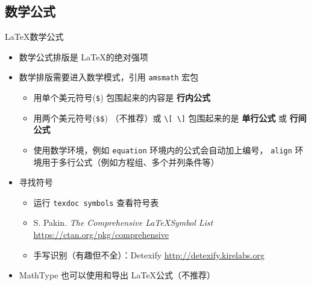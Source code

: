     \subsection{数学公式}
    \begin{frame}[fragile]{\LaTeX 数学公式}
        \begin{itemize}
        \item 数学公式排版是 \LaTeX 的绝对强项
        \item 数学排版需要进入数学模式，引用 \texttt{amsmath} 宏包
            \begin{itemize}
            \item 用单个美元符号(\verb|$|) 包围起来的内容是 {\bf 行内公式}
          \item 用两个美元符号(\verb|$$|) （不推荐）或 \verb|\[ \]| 包围起来的是 {\bf 单行公式} 或 {\bf 行间公式}
            \item 使用数学环境，例如 \texttt{equation} 环境内的公式会自动加上编号，
                \texttt{align} 环境用于多行公式（例如方程组、多个并列条件等）
          \end{itemize}
        \item 寻找符号
            \begin{itemize}
              \item 运行 \texttt{texdoc symbols} 查看符号表
              \item S. Pakin. \emph{The Comprehensive \LaTeX Symbol List}
                    \url{https://ctan.org/pkg/comprehensive}
              \item 手写识别（有趣但不全）：Detexify \url{http://detexify.kirelabs.org}
            \end{itemize}
        \item MathType 也可以使用和导出 \LaTeX 公式（不推荐）
        \end{itemize}
        \end{frame}
    
